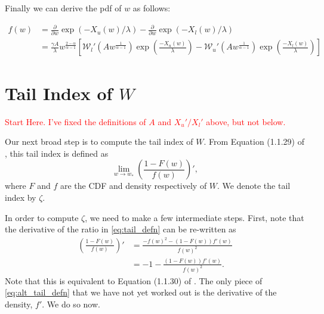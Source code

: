\documentclass{article}
\newcommand{\sW}{\mathscr{W}}
\begin{document}
Finally we can derive the pdf of $w$ as follows: 

\begin{align}
f(w) &= \frac{\partial}{\partial w} \exp(-X_u(w)/ \lambda) - \frac{\partial}{\partial w} \exp(-X_l(w)/\lambda) \\
&= \frac{\gamma A }{\lambda} w^{\frac{2-\alpha}{\alpha-1}} \left[ \sW_l'(A w^{ \frac{1}{\alpha-1} }) \exp\left(\frac{-X_{u}(w)}{\lambda}\right) - \sW_u'(A w^{ \frac{1}{\alpha-1} }) \exp\left(\frac{-X_{l}(w)}{\lambda}\right) \right]
\end{align}

\section{Tail Index of $W$}

\textcolor{red}{Start Here. I've fixed the definitions of $A$ and $X_u'/X_l'$ above, but not below.}

Our next broad step is to compute the tail index of $W$. From Equation (1.1.29) of \citet{deH06}, this tail index is defined as
%
\begin{equation}
    \lim_{w \rightarrow w_*} \left( \frac{1 - F(w)}{f(w)} \right)', \label{eq:tail_defn}
\end{equation}
%
where $F$ and $f$ are the CDF and density respectively of $W$. We denote the tail index by $\zeta$.

In order to compute $\zeta$, we need to make a few intermediate steps. First, note that the derivative of the ratio in \eqref{eq:tail_defn} can be re-written as
%
\begin{align}
    \left( \frac{1 - F(w)}{f(w)} \right)' &= \frac{-f(w)^2 - (1 - F(w)) f'(w)}{f(w)^2}\\
    &= -1 - \frac{(1 - F(w)) f'(w)}{f(w)^2}. \label{eq:alt_tail_defn}
\end{align}
%
Note that this is equivalent to Equation (1.1.30) of \citet{deH06}. The only piece of \eqref{eq:alt_tail_defn} that we have not yet worked out is the derivative of the density, $f'$. We do so now.
\end{document}
